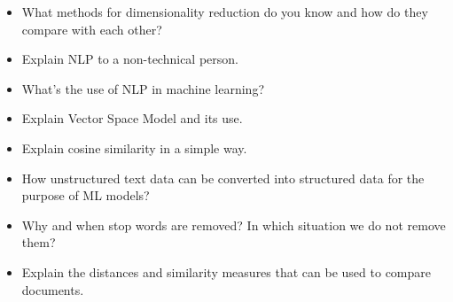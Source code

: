\documentclass{article}
\begin{document}
\begin{itemize}
	\item What methods for dimensionality reduction do you know and how do they compare with each other?
	\item Explain NLP to a non-technical person.
	\item What's the use of NLP in machine learning?
	\item Explain Vector Space Model and its use.
	\item Explain cosine similarity in a simple way.
	\item How unstructured text data can be converted into structured data for the purpose of ML models?
	\item Why and when stop words are removed? In which situation we do not remove them?
	\item Explain the distances and similarity measures that can be used to compare documents.
\end{itemize}
\end{document}
